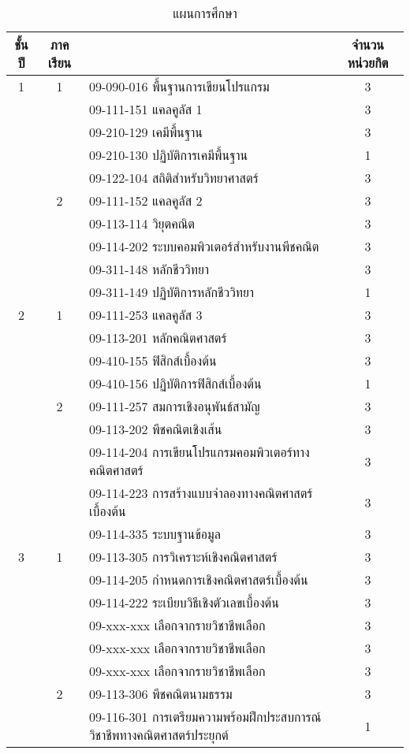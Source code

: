 \begin{longtable}{|c|c|>{\raggedright}p{}|c|}
	\caption{แผนการศึกษา}
	\label{table:Planyear}
	\\
	\hline
	{\bf ชั้นปี}&{\bf ภาคเรียน}&\multicolumn{1}{c|}{{\bf รายวิชา}}&{\bf จำนวนหน่วยกิต}\\
	\hline
	\endhead
	1&1&09-090-016	พื้นฐานการเขียนโปรแกรม	&	3\\
	&&09-111-151	แคลคูลัส 1			&3\\
	&&09-210-129	เคมีพื้นฐาน			&3\\
	&&09-210-130	ปฏิบัติการเคมีพื้นฐาน	&1\\
	&&09-122-104	สถิติสำหรับวิทยาศาสตร์	&3\\
	\cline{2-4}
	&2&09-111-152	แคลคูลัส 2	&3\\
	&&09-113-114	วิยุตคณิต	&3\\
	&&09-114-202	ระบบคอมพิวเตอร์สำหรับงานพีชคณิต	&3\\
	&&09-311-148	หลักชีววิทยา	&3\\
	&&09-311-149	ปฏิบัติการหลักชีววิทยา	&1\\
	\hline
	2&1&09-111-253	แคลคูลัส 3	&3\\
	&&09-113-201	หลักคณิตศาสตร์	&3\\
	&&09-410-155	ฟิสิกส์เบื้องต้น	&3\\
	&&09-410-156	ปฏิบัติการฟิสิกส์เบื้องต้น	&1\\
	\cline{2-4}
	&2&09-111-257	สมการเชิงอนุพันธ์สามัญ&3\\
	&&09-113-202	พีชคณิตเชิงเส้น&3\\
	&&09-114-204	การเขียนโปรแกรมคอมพิวเตอร์\newline ทางคณิตศาสตร์&3\\
	&&09-114-223	การสร้างแบบจำลองทางคณิตศาสตร์เบื้องต้น&3\\
	&&09-114-335	ระบบฐานข้อมูล&3\\
	\hline
	3&1&09-113-305	การวิเคราะห์เชิงคณิตศาสตร์&3\\
	&&09-114-205	กำหนดการเชิงคณิตศาสตร์เบื้องต้น&3\\
	&&09-114-222	ระเบียบวิธีเชิงตัวเลขเบื้องต้น&3\\
	&&09-xxx-xxx	เลือกจากรายวิชาชีพเลือก&3\\
	&&09-xxx-xxx	เลือกจากรายวิชาชีพเลือก&3\\
	&&09-xxx-xxx	เลือกจากรายวิชาชีพเลือก&3\\
	\cline{2-4}
	&2&09-113-306	พีชคณิตนามธรรม&3\\
	&&09-116-301	การเตรียมความพร้อมฝึกประสบการณ์วิชาชีพทางคณิตศาสตร์ประยุกต์&1\\

\end{longtable}

